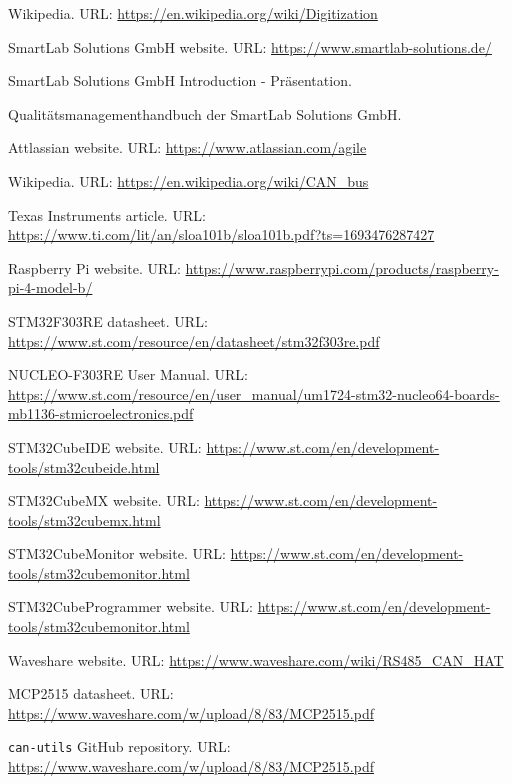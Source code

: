 
\renewcommand\bibname{Bibliography}

\begin{thebibliography}{9}
Wikipedia. URL: \url{https://en.wikipedia.org/wiki/Digitization}

SmartLab Solutions GmbH website. URL: \url{https://www.smartlab-solutions.de/}

SmartLab Solutions GmbH Introduction - Präsentation.

Qualitätsmanagementhandbuch der SmartLab Solutions GmbH.

Attlassian website. URL: \url{https://www.atlassian.com/agile}

Wikipedia. URL: \url{https://en.wikipedia.org/wiki/CAN\_bus}

Texas Instruments article. URL: \url{https://www.ti.com/lit/an/sloa101b/sloa101b.pdf?ts=1693476287427}

Raspberry Pi website. URL: \url{https://www.raspberrypi.com/products/raspberry-pi-4-model-b/}

STM32F303RE datasheet. URL: \url{https://www.st.com/resource/en/datasheet/stm32f303re.pdf}

NUCLEO-F303RE User Manual. URL: \url{https://www.st.com/resource/en/user\_manual/um1724-stm32-nucleo64-boards-mb1136-stmicroelectronics.pdf}

STM32CubeIDE website. URL: \url{https://www.st.com/en/development-tools/stm32cubeide.html}

STM32CubeMX website. URL: \url{https://www.st.com/en/development-tools/stm32cubemx.html}

STM32CubeMonitor website. URL: \url{https://www.st.com/en/development-tools/stm32cubemonitor.html}

STM32CubeProgrammer website. URL: \url{https://www.st.com/en/development-tools/stm32cubemonitor.html}

Waveshare website. URL: \url{https://www.waveshare.com/wiki/RS485\_CAN\_HAT}

MCP2515 datasheet. URL: \url{https://www.waveshare.com/w/upload/8/83/MCP2515.pdf}

\texttt{can-utils} GitHub repository. URL: \url{https://www.waveshare.com/w/upload/8/83/MCP2515.pdf}


\end{thebibliography}
